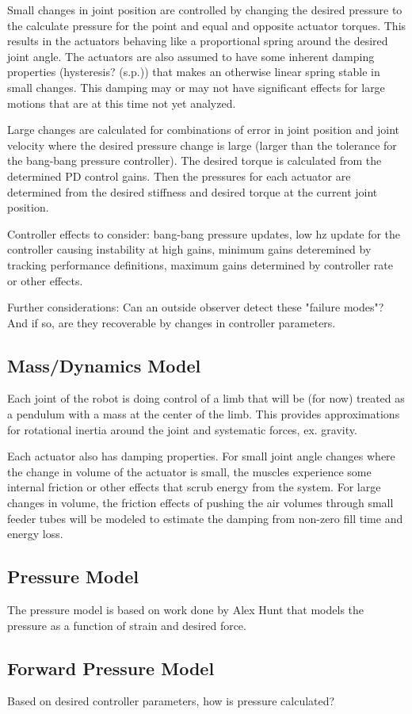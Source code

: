 \documentclass[12pt, letterpaper, oneside, notitlepage, onecolumn]{article}
\newcommand{\bbss}[1]{\subsection{#1}}
\begin{document}
Small changes in joint position are controlled by changing the desired pressure
to the calculate pressure for the point and equal and opposite actuator torques.
This results in the actuators behaving like a proportional spring around the
desired joint angle. The actuators are also assumed to have some inherent
damping properties (hysteresis? (s.p.)) that makes an otherwise linear spring
stable in small changes. This damping may or may not have significant effects
for large motions that are at this time not yet analyzed.

Large changes are calculated for combinations of error in joint position and
joint velocity where the desired pressure change is large (larger than the
tolerance for the bang-bang pressure controller). The desired torque is
calculated from the determined PD control gains. Then the pressures for each
actuator are determined from the desired stiffness and desired torque at the
current joint position.

Controller effects to consider: bang-bang pressure updates, low hz update for
the controller causing instability at high gains, minimum gains deteremined by
tracking performance definitions, maximum gains determined by controller rate or
other effects.

Further considerations: Can an outside observer detect these "failure modes"?
And if so, are they recoverable by changes in controller parameters.

\bbss{Mass/Dynamics Model}

Each joint of the robot is doing control of a limb that will be (for now)
treated as a pendulum with a mass at the center of the limb. This provides
approximations for rotational inertia around the joint and systematic forces,
ex. gravity. 

Each actuator also has damping properties. For small joint angle changes where
the change in volume of the actuator is small, the muscles experience some
internal friction or other effects that scrub energy from the system. For large
changes in volume, the friction effects of pushing the air volumes through small
feeder tubes will be modeled to estimate the damping from non-zero fill time and
energy loss.

\bbss{Pressure Model}

The pressure model is based on work done by Alex Hunt that models the pressure
as a function of strain and desired force.

\bbss{Forward Pressure Model}

Based on desired controller parameters, how is pressure calculated?
\end{document}
